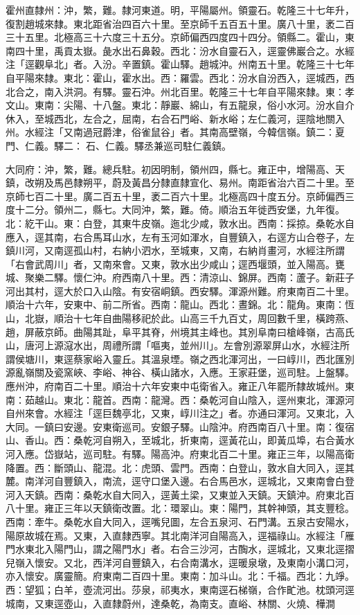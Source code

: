 \begin{pinyinscope}
霍州直隸州：沖，繁，難。隸河東道。明，平陽屬州。領靈石。乾隆三十七年升，復割趙城來隸。東北距省治四百六十里。至京師千五百五十里。廣八十里，袤二百三十五里。北極高三十六度三十五分。京師偏西四度四十四分。領縣二。霍山，東南四十里，禹貢太嶽。彘水出石鼻穀。西北：汾水自靈石入，逕靈佛巖合之。水經注「逕觀阜北」者。入汾。辛置鎮。霍山驛。趙城沖。州南五十里。乾隆三十七年自平陽來隸。東北：霍山，霍水出。西：羅雲。西北：汾水自汾西入，逕城西，西北合之，南入洪洞。有驛。靈石沖。州北百里。乾隆三十七年自平陽來隸。東：孝文山。東南：尖陽、十八盤。東北：靜巖、綿山，有五龍泉，俗小水河。汾水自介休入，至城西北，左合之，屈南，右合石門峪、新水峪；左仁義河，逕陰地關入州。水經注「又南過冠爵津，俗雀鼠谷」者。其南高壁嶺，今韓信嶺。鎮二：夏門、仁義。驛二：石、仁義。驛丞兼巡司駐仁義鎮。

大同府：沖，繁，難。總兵駐。初因明制，領州四，縣七。雍正中，增陽高、天鎮，改朔及馬邑隸朔平，蔚及黃昌分隸直隸宣化、易州。南距省治六百二十里。至京師七百二十里。廣二百五十里，袤二百六十里。北極高四十度五分。京師偏西三度十二分。領州二，縣七。大同沖，繁，難。倚。順治五年徙西安堡，九年復。北：紇干山。東：白登，其東牛皮嶺。迤北少咸，敦水出。西南：採掠。桑乾水自應入，逕其南，右合馬耳山水，左有玉河如渾水，自豐鎮入，右逕方山合卷子，左鎮川河，又南逕孤山村，右納小泗水，至城東，又南，右納肖畫河，水經注所謂「右會武周川」者，又南來會。又東，敦水出少咸山；逕西堰頭，並入陽高。甕城、聚樂二驛。懷仁沖。府西南八十里。西：清涼山、錦屏。西南：蘆子。新莊子河出其村，逕大於口入山陰。有安宿峒鎮。西安驛。渾源州難。府東南百二十里。順治十六年，安東中、前二所省。西南：龍山。西北：晝錦。北：龍角。東南：恆山，北嶽，順治十七年自曲陽移祀於此。山高三千九百丈，周回數千里，橫跨燕、趙，屏蔽京師。曲陽其趾，阜平其脊，州境其主峰也。其別阜南曰槍峰嶺，古高氏山，唐河上源滱水出，周禮所謂「嘔夷，並州川」。左會別源翠屏山水，水經注所謂侯塘川，東逕蔡家峪入靈丘。其溫泉堙。嶺之西北渾河出，一曰崞川，西北匯別源亂嶺關及瓷窯峽、李峪、神谷、橫山諸水，入應。王家莊堡，巡司駐。上盤驛。應州沖，府南百二十里。順治十六年安東中屯衛省入。雍正八年罷所隸故城州。東南：茹越山。東北：龍首。西南：龍灣。西：桑乾河自山陰入，逕州東北，渾源河自州來會。水經注「逕巨魏亭北，又東，崞川注之」者。亦通曰渾河。又東北，入大同。一鎮曰安邊。安東衛巡司。安銀子驛。山陰沖。府西南百八十里。南：復宿山、香山。西：桑乾河自朔入，至城北，折東南，逕黃花山，即黃瓜埠，右合黃水河入應。岱嶽站，巡司駐。有驛。陽高沖。府東北百二十里。雍正三年，以陽高衛降置。西：斷頭山、龍混。北：虎頭、雲門。西南：白登山，敦水自大同入，逕其麓。南洋河自豐鎮入，南流，逕守口堡入邊。右合馬邑水，逕城北，又東南會白登河入天鎮。西南：桑乾水自大同入，逕黃土梁，又東並入天鎮。天鎮沖。府東北百八十里。雍正三年以天鎮衛改置。北：環翠山。東：陽門，其幹神頭，其支豐稔。西南：牽牛。桑乾水自大同入，逕嘴兒圖，左合五泉河、石門溝。五泉古安陽水，陽原故城在焉。又東，入直隸西寧。其北南洋河自陽高入，逕福祿山。水經注「雁門水東北入陽門山，謂之陽門水」者。右合三沙河，古醄水，逕城北，又東北逕摺兒嶺入懷安。又北，西洋河自豐鎮入，右合南溝水，逕暖泉墩，及東南小溝口河，亦入懷安。廣靈簡。府東南二百四十里。東南：加斗山。北：千福。西北：九竫。西：望狐；白羊，壺流河出。莎泉，祁夷水，東南逕石梯嶺，合作甿池。枕頭河逕城南，又東逕壺山，入直隸蔚州，達桑乾，為南支。直峪、林關、火燒、樺澗
\end{pinyinscope}
